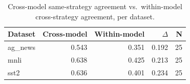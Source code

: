 \begin{table}[t]
\centering
\caption{Cross-model same-strategy agreement vs.\ within-model cross-strategy agreement, per dataset.}
\label{tab:crossmodel}
\begin{tabular}{lrrrr}
\toprule
Dataset & Cross-model & Within-model & $\Delta$ & N \\
\midrule
ag_news & 0.543 & 0.351 & 0.192 & 25 \\
mnli & 0.638 & 0.425 & 0.213 & 25 \\
sst2 & 0.636 & 0.401 & 0.234 & 25 \\
\bottomrule
\end{tabular}
\end{table}
